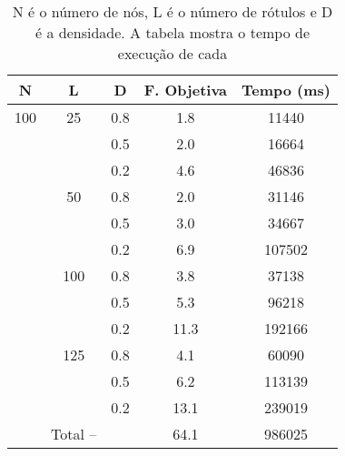 \documentclass{sig-alternate-05-2015}
\begin{document}
\begin{table}[!h]


\begin{tabular}{ccccc}
        \hline \rule[-2ex]{0pt}{5.5ex} N & L & D & F. Objetiva & Tempo (ms) \\
         \hline\rule[-2ex]{0pt}{5.5ex} 100 & 25 & 0.8 & 1.8 & 11440 \\
         \rule[-2ex]{0pt}{5.5ex}  &  & 0.5 & 2.0 & 16664 \\
         \rule[-2ex]{0pt}{5.5ex}  &  & 0.2 & 4.6 & 46836 \\
         \rule[-2ex]{0pt}{5.5ex}  & 50 & 0.8 & 2.0 & 31146 \\
         \rule[-2ex]{0pt}{5.5ex}  &  & 0.5 & 3.0 & 34667 \\
         \rule[-2ex]{0pt}{5.5ex}  &  & 0.2 & 6.9 & 107502 \\
         \rule[-2ex]{0pt}{5.5ex}  & 100 & 0.8 & 3.8 & 37138 \\
         \rule[-2ex]{0pt}{5.5ex}  &  & 0.5 & 5.3 & 96218 \\ 
         \rule[-2ex]{0pt}{5.5ex}  &  & 0.2 & 11.3 & 192166 \\ 
         \rule[-2ex]{0pt}{5.5ex}  & 125 & 0.8 & 4.1 & 60090 \\ 
         \rule[-2ex]{0pt}{5.5ex}  &  & 0.5 & 6.2 & 113139 \\ 
         \rule[-2ex]{0pt}{5.5ex}  &  & 0.2 & 13.1 & 239019 \\ 
         \hline\rule[-2ex]{0pt}{5.5ex}  & Total -- &  & 64.1 & 986025 \\ 
        \hline 
\end{tabular} 
\caption{N é o número de nós, L é o número de rótulos e D é a densidade.  A tabela mostra o tempo de execução de cada}
\label{tab2}
\end{table}
\end{document}
